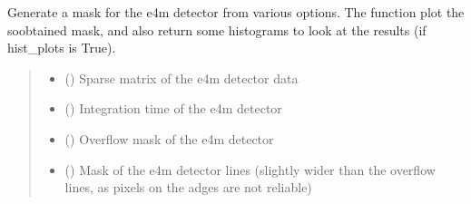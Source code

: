 \documentclass[letterpaper,10pt,english]{sphinxmanual}
\begin{document}
\begin{fulllineitems}
\label{\detokenize{index:XPCS_tools.gen_mask}}
\pysigstartsignatures
\pysiglinewithargsret
{}
{\sphinxparamcomma {}\sphinxparamcomma {}\sphinxparamcomma {}\sphinxparamcomma {}\sphinxparamcomma {}\sphinxparamcomma {}\sphinxparamcomma {}\sphinxparamcomma {}\sphinxparamcomma {}\sphinxparamcomma {}\sphinxparamcomma {}}
{}
\pysigstopsignatures
\sphinxAtStartPar
Generate a mask for the e4m detector from various options. The function plot the so\sphinxhyphen{}obtained mask, and also return some histograms to look at the results (if hist\_plots is True).
\begin{quote}\begin{description}
\begin{itemize}
\item {} 
\sphinxAtStartPar
{} () \textendash{} Sparse matrix of the e4m detector data

\item {} 
\sphinxAtStartPar
{} () \textendash{} Integration time of the e4m detector

\item {} 
\sphinxAtStartPar
{} () \textendash{} Overflow mask of the e4m detector

\item {} 
\sphinxAtStartPar
{} () \textendash{} Mask of the e4m detector lines (slightly wider than the overflow lines, as pixels on the adges are not reliable)


\end{itemize}
\end{description}
\end{quote}
\end{fulllineitems}
\end{document}
